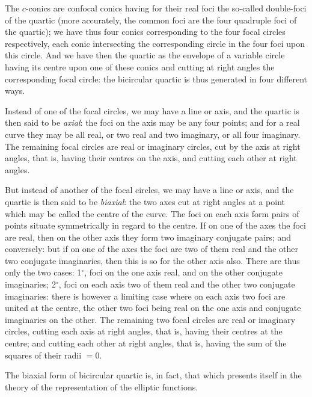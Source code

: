 \documentclass[11pt,a4paper]{book}
\begin{document}
The $c$-conics are confocal conics having for their real foci the so-called double-foci of the quartic (more accurately, the common foci are the four quadruple foci of the quartic); we have thus four conics corresponding to the four focal circles respectively, each conic intersecting the corresponding circle in the four foci upon this circle. And we have then the quartic as the envelope of a variable circle having its centre upon one of these conics and cutting at right angles the corresponding focal circle: the bicircular quartic is thus generated in four different ways.

Instead of one of the focal circles, we may have a line or axis, and the quartic is then said to be \emph{axial}: the foci on the axis may be any four points; and for a real curve they may be all real, or two real and two imaginary, or all four imaginary. The remaining focal circles are real or imaginary circles, cut by the axis at right angles, that is, having their centres on the axis, and cutting each other at right angles.

But instead of another of the focal circles, we may have a line or axis, and the quartic is then said to be \emph{biaxial}: the two axes cut at right angles at a point which may be called the centre of the curve. The foci on each axis form pairs of points situate symmetrically in regard to the centre. If on one of the axes the foci are real, then on the other axis they form two imaginary conjugate pairs; and conversely: but if on one of the axes the foci are two of them real and the other two conjugate imaginaries, then this is so for the other axis also. There are thus only the two cases: 1$^\circ$, foci on the one axis real, and on the other conjugate imaginaries; 2$^\circ$, foci on each axis two of them real and the other two conjugate imaginaries: there is however a limiting case where on each axis two foci are united at the centre, the other two foci being real on the one axis and conjugate imaginaries on the other. The remaining two focal circles are real or imaginary circles, cutting each axis at right angles, that is, having their centres at the centre; and cutting each other at right angles, that is, having the sum of the squares of their radii $= 0$.

The biaxial form of bicircular quartic is, in fact, that which presents itself in the theory of the representation of the elliptic functions.
\end{document}
